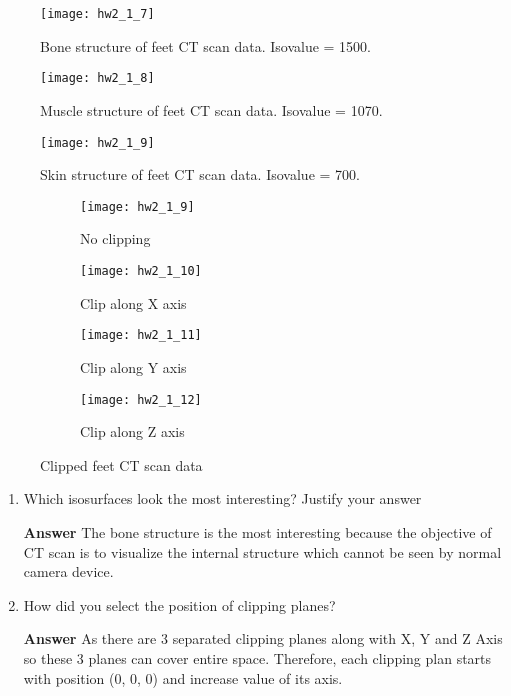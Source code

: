 \documentclass[11pt]{article}
\begin{document}
\begin{figure}[H]
\centering
\texttt{[image: hw2\_1\_7]}
\caption{Bone structure of feet CT scan data. Isovalue = 1500.}
\label{fig:hw2_1_7}
\end{figure}

\begin{figure}[H]
\centering
\texttt{[image: hw2\_1\_8]}
\caption{Muscle structure of feet CT scan data. Isovalue = 1070.}
\label{fig:hw2_1_8}
\end{figure}

\begin{figure}[H]
\centering
\texttt{[image: hw2\_1\_9]}
\caption{Skin structure of feet CT scan data. Isovalue = 700.}
\label{fig:hw2_1_9}
\end{figure}

\begin{figure}[H]
\begin{subfigure}{.5\textwidth}
  \centering
  \texttt{[image: hw2\_1\_9]}
  \caption{No clipping}
  \label{fig:hw2_1_9}
\end{subfigure}
\begin{subfigure}{.5\textwidth}
  \centering
  \texttt{[image: hw2\_1\_10]}
  \caption{Clip along X axis}
  \label{fig:hw2_1_10}
\end{subfigure}

\begin{subfigure}{.5\textwidth}
  \centering
  \texttt{[image: hw2\_1\_11]}
  \caption{Clip along Y axis}
  \label{fig:hw2_1_11}
\end{subfigure}
\begin{subfigure}{.5\textwidth}
  \centering
  \texttt{[image: hw2\_1\_12]}
  \caption{Clip along Z axis}
  \label{fig:hw2_1_12}
\end{subfigure}
\caption{Clipped feet CT scan data}
\label{fig:hw2_1_9-12}
\end{figure}

\begin{enumerate}[label=\arabic*.]

\item Which isosurfaces look the most interesting? Justify your answer

\noindent\textbf{Answer} The bone structure is the most interesting because the objective of CT scan is to visualize the internal structure which cannot be seen by normal camera device.

\item How did you select the position of clipping planes?

\noindent\textbf{Answer} As there are 3 separated clipping planes along with X, Y and Z Axis so these 3 planes can cover entire space. Therefore, each clipping plan starts with position (0, 0, 0) and increase value of its axis. 

\end{enumerate}
\end{document}
